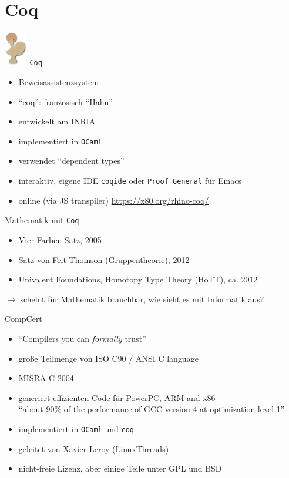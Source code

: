 \documentclass[aspectratio=169]{beamer}
\begin{document}
\section{Coq}
\begin{frame}
  \begin{center}
    \includegraphics[width=1.0cm]{coq_logo.png}
    \Large{\texttt{Coq}}
  \end{center}
  \begin{itemize}
  \item Beweisassistenzsystem
  \item ``coq'': französisch ``Hahn''
  \item entwickelt am INRIA
  \item implementiert in \texttt{OCaml}
  \item verwendet ``dependent types''
  \item interaktiv, eigene IDE \texttt{coqide} oder \texttt{Proof General} für Emacs
  \item online (via JS transpiler) \url{https://x80.org/rhino-coq/}
  \end{itemize}
\end{frame}
\begin{frame}
  \begin{center}
    \Large{Mathematik mit \texttt{Coq}}
  \end{center}
  \begin{itemize}
  \item Vier-Farben-Satz, 2005
  \item Satz von Feit-Thomson (Gruppentheorie), 2012
  \item Univalent Foundations, Homotopy Type Theory (HoTT), ca. 2012
  \end{itemize}
  \pause
  \vfill
  $\rightarrow$ scheint für Mathematik brauchbar, wie sieht es mit Informatik aus?
\end{frame}
\begin{frame}
  \begin{center}
    \Large{CompCert}
  \end{center}
  \begin{itemize}
  \item ``Compilers you can \textit{formally} trust''
  \item große Teilmenge von ISO C90 / ANSI C language
  \item MISRA-C 2004
  \item generiert effizienten Code für PowerPC, ARM and x86\\
    ``about 90\% of the performance of GCC version 4 at optimization level 1''
  \item implementiert in \texttt{OCaml} und \texttt{coq}
  \item geleitet von Xavier Leroy (LinuxThreads) 
  \item nicht-freie Lizenz, aber einige Teile unter GPL und BSD
  \end{itemize}
\end{frame}
\end{document}
